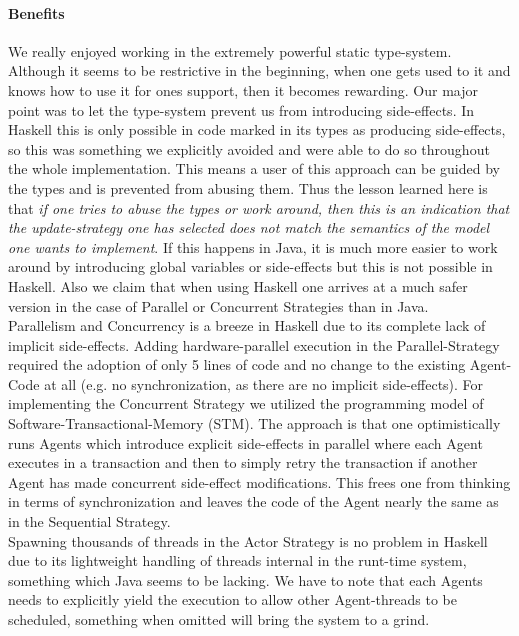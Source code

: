 \paragraph{Benefits}
We really enjoyed working in the extremely powerful static type-system. Although it seems to be restrictive in the beginning, when one gets used to it and knows how to use it for ones support, then it becomes rewarding. Our major point was to let the type-system prevent us from introducing side-effects. In Haskell this is only possible in code marked in its types as producing side-effects, so this was something we explicitly avoided and were able to do so throughout the whole implementation. This means a user of this approach can be guided by the types and is prevented from abusing them. Thus the lesson learned here is that \textit{if one tries to abuse the types or work around, then this is an indication that the update-strategy one has selected does not match the semantics of the model one wants to implement}. If this happens in Java, it is much more easier to work around by introducing global variables or side-effects but this is not possible in Haskell. Also we claim that when using Haskell one arrives at a much safer version in the case of Parallel or Concurrent Strategies than in Java.\\

Parallelism and Concurrency is a breeze in Haskell due to its complete lack of implicit side-effects. Adding hardware-parallel execution in the Parallel-Strategy required the adoption of only 5 lines of code and no change to the existing Agent-Code at all (e.g. no synchronization, as there are no implicit side-effects). For implementing the Concurrent Strategy we utilized the programming model of Software-Transactional-Memory (STM). The approach is that one optimistically runs Agents which introduce explicit side-effects in parallel where each Agent executes in a transaction and then to simply retry the transaction if another Agent has made concurrent side-effect modifications. This frees one from thinking in terms of synchronization and leaves the code of the Agent nearly the same as in the Sequential Strategy. \\
Spawning thousands of threads in the Actor Strategy is no problem in Haskell due to its lightweight handling of threads internal in the runt-time system, something which Java seems to be lacking. We have to note that each Agents needs to explicitly yield the execution to allow other Agent-threads to be scheduled, something when omitted will bring the system to a grind.

